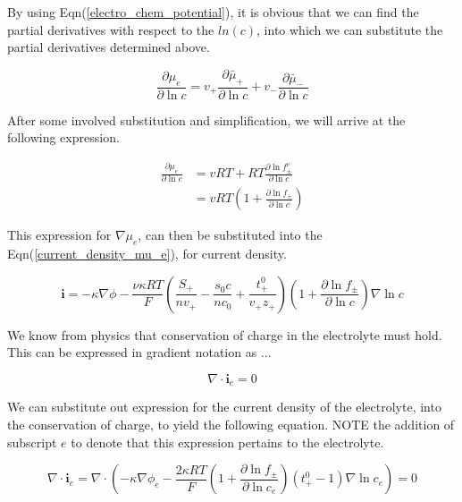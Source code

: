 \documentclass[lettersize,journal]{IEEEtran}
\begin{document}
\noindent By using Eqn(\ref{electro_chem_potential}), it is obvious that we can find the partial derivatives with respect to the $ln(c)$, into which we can substitute the partial derivatives determined above.

\begin{equation}
\frac{\partial \mu_{e}}{\partial \ln c} =v_{+} \frac{\partial \bar{\mu}_{+}}{\partial \ln c}+v_{-} \frac{\partial \bar{\mu}_{-}}{\partial \ln c}
\end{equation}

\noindent After some involved substitution and simplification, we will arrive at the following expression.

\begin{equation}
\begin{aligned}
\frac{\partial \mu_{e}}{\partial \ln c} &=v R T+R T \frac{\partial \ln f_{\pm}^{\nu}}{\partial \ln c} \\
&=v R T\left(1+\frac{\partial \ln f_{\pm}}{\partial \ln c}\right)
\end{aligned}
\end{equation}


\noindent This expression for $\nabla \mu_e$, can then be substituted into the Eqn(\ref{current_density_mu_e}), for current density.

\begin{equation}
\mathbf{i}=-\kappa \nabla \phi-\frac{\nu \kappa R T}{F}\left(\frac{S_{+}}{n v_{+}}-\frac{s_{0} c}{n c_{0}}+\frac{t_{+}^{0}}{v_{+} z_{+}}\right)\left(1+\frac{\partial \ln f_{\pm}}{\partial \ln c}\right) \nabla \ln c
\end{equation}

\noindent We know from physics that conservation of charge in the electrolyte must hold. This can be expressed in gradient notation as ...

\begin{equation}
  \nabla \cdot \mathbf{i}_e = 0
\end{equation}

\noindent We can substitute out expression for the current density of the electrolyte, into the conservation of charge, to yield the following equation. NOTE the addition of subscript $e$ to denote that this expression pertains to the electrolyte.

\begin{equation}
\nabla \cdot \mathbf{i}_{e}=\nabla \cdot\left(-\kappa \nabla \phi_{e}-\frac{2 \kappa R T}{F}\left(1+\frac{\partial \ln f_{\pm}}{\partial \ln c_{e}}\right)\left(t_{+}^{0}-1\right) \nabla \ln c_{e}\right)=0
\end{equation}
\end{document}
